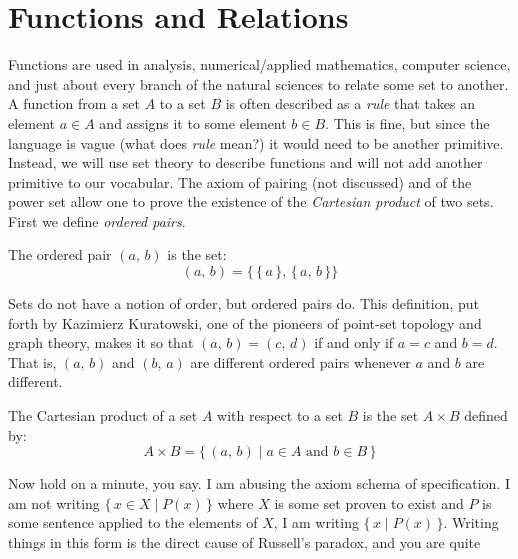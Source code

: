     \section{Functions and Relations}
        Functions are used in analysis, numerical/applied mathematics,
        computer science, and just about every branch of the natural sciences
        to relate some set to another. A function from a set $A$ to a set $B$
        is often described as a \textit{rule} that takes an element $a\in{A}$
        and assigns it to some element $b\in{B}$. This is fine, but since the
        language is vague (what does \textit{rule} mean?) it would need to be
        another primitive. Instead, we will use set theory to describe functions
        and will not add another primitive to our vocabular. The axiom of
        pairing (not discussed) and of the power set allow one to prove the
        existence of the \textit{Cartesian product} of two sets. First we define
        \textit{ordered pairs}.
        \begin{definition}
            The ordered pair $(a,\,b)$ is the set:
            \begin{equation}
                (a,\,b)=\big\{\,\{\,a\,\},\,\{\,a,\,b\,\}\big\}
            \end{equation}
        \end{definition}
        Sets do not have a notion of order, but ordered pairs do. This
        definition, put forth by Kazimierz Kuratowski, one of the pioneers
        of point-set topology and graph theory, makes it so that
        $(a,\,b)=(c,\,d)$ if and only if $a=c$ and $b=d$. That is,
        $(a,\,b)$ and $(b,\,a)$ are different ordered pairs whenever $a$ and
        $b$ are different.
        \begin{definition}
            The Cartesian product of a set $A$ with respect to a set $B$ is the
            set $A\times{B}$ defined by:
            \begin{equation}
                A\times{B}=\{\,(a,\,b)\;|\;a\in{A}\textrm{ and }b\in{B}\,\}
            \end{equation}
        \end{definition}
        Now hold on a minute, you say. I am abusing the axiom schema of
        specification. I am not writing $\{\,x\in{X}\;|\;P(x)\,\}$ where $X$
        is some set proven to exist and $P$ is some sentence applied to the
        elements of $X$, I am writing $\{\,x\;|\;P(x)\,\}$. Writing things in
        this form is the direct cause of Russell's paradox, and you are quite
